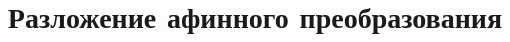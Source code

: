 \documentclass[a4paper]{scrartcl}
\begin{document}
\title{Разложение афинного преобразования}

\stealcurrent
\end{document}
